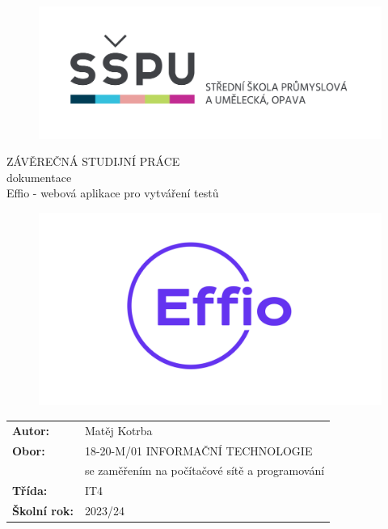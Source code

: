 \documentclass[12pt, a4paper,
openright
]{report}
\title{\nazevPrace} %
\author{\jmenoAutora} %
\date{\datumOdevzdani} %
\newcommand\obor{INFORMAČNÍ TECHNOLOGIE} %
\newcommand\kodOboru{18-20-M/01} %
\newcommand\zamereni{se zaměřením na počítačové sítě a programování} %
\newcommand\trida{IT4} %
\newcommand\jmenoAutora{Matěj Kotrba}  %
\newcommand\skolniRok{2023/24} %
\newcommand\nazevPrace{Effio - webová aplikace pro vytváření testů} %
\begin{document}
	
	\pagestyle{empty}
	
	\cleardoublepage

	
	{\selectfont
		\begin{figure}[h]
			\centering
			\includegraphics[width=0.6\linewidth]{image/logo-skoly.png} 
		\end{figure}
		
		
		{\bfseries %
			\begin{center}
				\vspace{0.025 \textheight}
				\LARGE{ZÁVĚREČNÁ STUDIJNÍ PRÁCE}\\
				\large{dokumentace}\\
				\vspace{0.075 \textheight}
				\LARGE {\nazevPrace}\\
			\end{center}  
		}%
		
		\begin{figure}[h]
			\centering
			\includegraphics[width=0.8\linewidth]{image/effio.png} 
		\end{figure}
		
		\vspace{0.02 \textheight}
		\begin{table}[h!]
			\begin{tabular}{ll}
				\textbf{Autor:} & \jmenoAutora\\ 
				\textbf{Obor:} & \kodOboru { } \obor\\
				\textbf{} & \zamereni\\
				\textbf{Třída:} & \trida\\
				\textbf{Školní rok:} & \skolniRok\\
			\end{tabular}
			
		\end{table}		
	}
	
\end{document}
